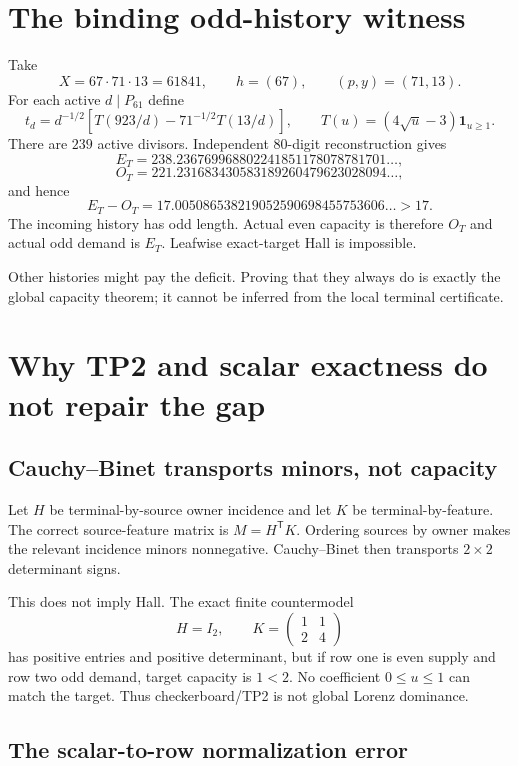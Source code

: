 \documentclass[11pt]{article}
\newcommand{\1}{\mathbf 1}
\begin{document}
\section{The binding odd-history witness}

Take
\[
X=67\cdot71\cdot13=61841,
\qquad h=(67),
\qquad(p,y)=(71,13).
\]
For each active $d\mid P_{61}$ define
\[
t_d=d^{-1/2}\left[T(923/d)-71^{-1/2}T(13/d)\right],
\qquad T(u)=(4\sqrt u-3)\1_{u\ge1}.
\]
There are $239$ active divisors.  Independent 80-digit reconstruction gives
\[
E_T=238.236769968802241851178078781701\ldots,
\]
\[
O_T=221.231683430583189260479623028094\ldots,
\]
and hence
\begin{equation}\label{eq:oddgap}
\boxed{E_T-O_T=17.005086538219052590698455753606\ldots>17.}
\end{equation}
The incoming history has odd length.  Actual even capacity is therefore $O_T$ and actual odd demand is $E_T$.  Leafwise exact-target Hall is impossible.

Other histories might pay the deficit.  Proving that they always do is exactly the global capacity theorem; it cannot be inferred from the local terminal certificate.

\section{Why TP2 and scalar exactness do not repair the gap}

\subsection{Cauchy--Binet transports minors, not capacity}

Let $H$ be terminal-by-source owner incidence and let $K$ be terminal-by-feature.  The correct source-feature matrix is $M=H^{\mathsf T}K$.  Ordering sources by owner makes the relevant incidence minors nonnegative.  Cauchy--Binet then transports $2\times2$ determinant signs.

This does not imply Hall.  The exact finite countermodel
\[
H=I_2,
\qquad K=\begin{pmatrix}1&1\\2&4\end{pmatrix}
\]
has positive entries and positive determinant, but if row one is even supply and row two odd demand, target capacity is $1<2$.  No coefficient $0\le u\le1$ can match the target.  Thus checkerboard/TP2 is not global Lorenz dominance.

\subsection{The scalar-to-row normalization error}
\end{document}
